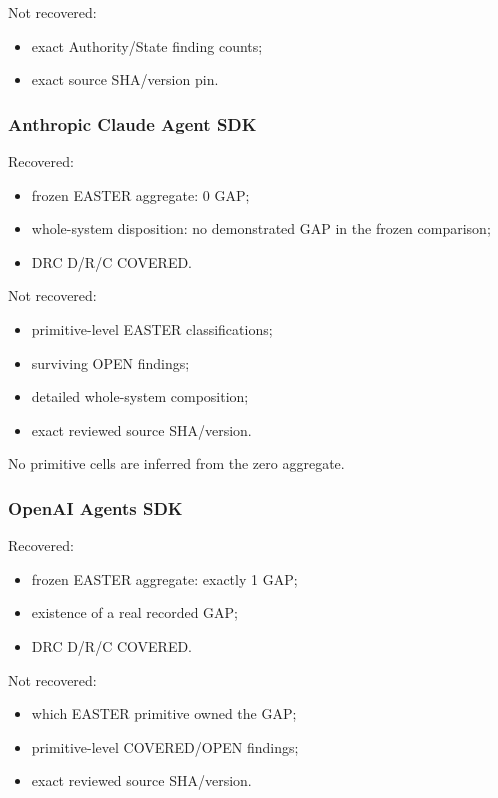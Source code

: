 \documentclass[11pt]{article}
\begin{document}
Not recovered:

\begin{itemize}
\item exact Authority/State finding counts;
\item exact source SHA/version pin.
\end{itemize}

\subsubsection{Anthropic Claude Agent SDK}

Recovered:

\begin{itemize}
\item frozen EASTER aggregate: 0 GAP;
\item whole-system disposition: no demonstrated GAP in the frozen comparison;
\item DRC D/R/C COVERED.
\end{itemize}

Not recovered:

\begin{itemize}
\item primitive-level EASTER classifications;
\item surviving OPEN findings;
\item detailed whole-system composition;
\item exact reviewed source SHA/version.
\end{itemize}

No primitive cells are inferred from the zero aggregate.

\subsubsection{OpenAI Agents SDK}

Recovered:

\begin{itemize}
\item frozen EASTER aggregate: exactly 1 GAP;
\item existence of a real recorded GAP;
\item DRC D/R/C COVERED.
\end{itemize}

Not recovered:

\begin{itemize}
\item which EASTER primitive owned the GAP;
\item primitive-level COVERED/OPEN findings;
\item exact reviewed source SHA/version.
\end{itemize}
\end{document}
